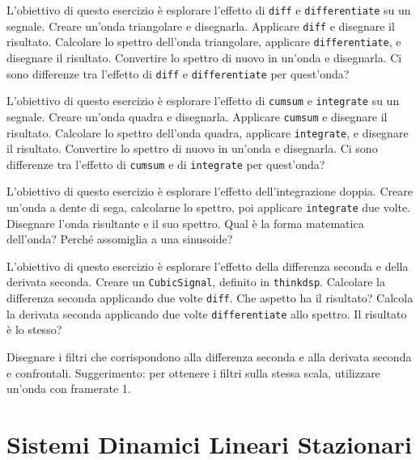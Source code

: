 \documentclass[12pt]{book} \usepackage[width=5.5in,height=8.5in, hmarginratio=3:2,vmarginratio=1:1]{geometry}
\begin{document}
\begin{exercise} L'obiettivo di questo esercizio è esplorare l'effetto di {\tt diff} e {\tt differentiate} su un segnale. Creare un'onda triangolare e disegnarla. Applicare {\tt diff} e disegnare il risultato. Calcolare lo spettro dell'onda triangolare, applicare {\tt differentiate}, e disegnare il risultato. Convertire lo spettro di nuovo in un'onda e disegnarla. Ci sono differenze tra l'effetto di {\tt diff} e {\tt differentiate} per quest'onda? \end{exercise} 

\begin{exercise} L'obiettivo di questo esercizio è esplorare l'effetto di {\tt cumsum} e {\tt integrate} su un segnale. Creare un'onda quadra e disegnarla. Applicare {\tt cumsum} e disegnare il risultato. Calcolare lo spettro dell'onda quadra, applicare {\tt integrate}, e disegnare il risultato. Convertire lo spettro di nuovo in un'onda e disegnarla. Ci sono differenze tra l'effetto di {\tt cumsum} e di {\tt integrate} per quest'onda? \end{exercise} 

\begin{exercise} L'obiettivo di questo esercizio è esplorare l'effetto dell'integrazione doppia. Creare un'onda a dente di sega, calcolarne lo spettro, poi applicare {\tt integrate} due volte. Disegnare l'onda risultante e il suo spettro. Qual è la forma matematica dell'onda? Perché assomiglia a una sinusoide? \end{exercise} 

\begin{exercise} L'obiettivo di questo esercizio è esplorare l'effetto della differenza seconda e della derivata seconda. Creare un {\tt CubicSignal}, definito in {\tt thinkdsp}. Calcolare la differenza seconda applicando due volte {\tt diff}. Che aspetto ha il risultato? Calcola la derivata seconda applicando due volte {\tt differentiate} allo spettro. Il risultato è lo stesso?

Disegnare i filtri che corrispondono alla differenza seconda e alla derivata seconda e confrontali. Suggerimento: per ottenere i filtri sulla stessa scala, utilizzare un'onda con framerate 1. \end{exercise} 

\chapter{Sistemi Dinamici Lineari Stazionari} \label{systems} 
\end{document}
